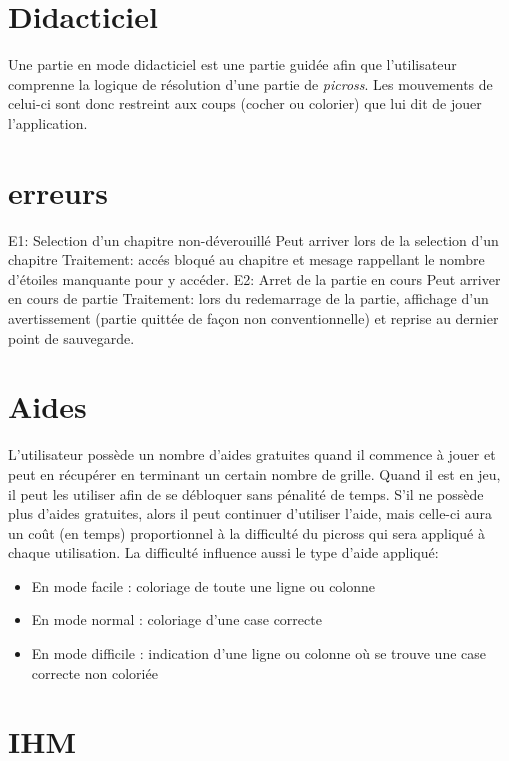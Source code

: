 \documentclass{report}
\begin{document}
	
	\section{Didacticiel}
	
	Une partie en mode didacticiel est une partie guidée afin que l'utilisateur comprenne la logique de résolution d'une partie de \textit{picross}. Les mouvements de celui-ci sont donc restreint aux coups (cocher ou colorier) que lui dit de jouer l'application.
	
	\section{erreurs}
	
		E1: Selection d'un chapitre non-déverouillé
			Peut arriver lors de la selection d'un chapitre
			Traitement: accés bloqué au chapitre et mesage rappellant le nombre d'étoiles manquante pour y accéder.
		E2: Arret de la partie en cours
			Peut arriver en cours de partie
			Traitement: lors du redemarrage de la partie, affichage d'un avertissement (partie quittée de façon non conventionnelle) et reprise au dernier point de sauvegarde.
			
  \section{Aides}

  L'utilisateur possède un nombre d'aides gratuites quand il commence à jouer et peut en récupérer en terminant un certain nombre de grille. Quand il est en jeu, il peut les utiliser afin de se débloquer sans pénalité de temps. S'il ne possède plus d'aides gratuites, alors il peut continuer d'utiliser l'aide, mais celle-ci aura un coût (en temps) proportionnel à la difficulté du picross qui sera appliqué à chaque utilisation. La difficulté influence aussi le type d'aide appliqué:
    \begin{itemize}
    \item En mode facile : coloriage de toute une ligne ou colonne
    \item En mode normal : coloriage d'une case correcte 
    \item En mode difficile : indication d'une ligne ou colonne où se trouve une case correcte non coloriée
    \end{itemize}


  \section{IHM}
  
\end{document}
